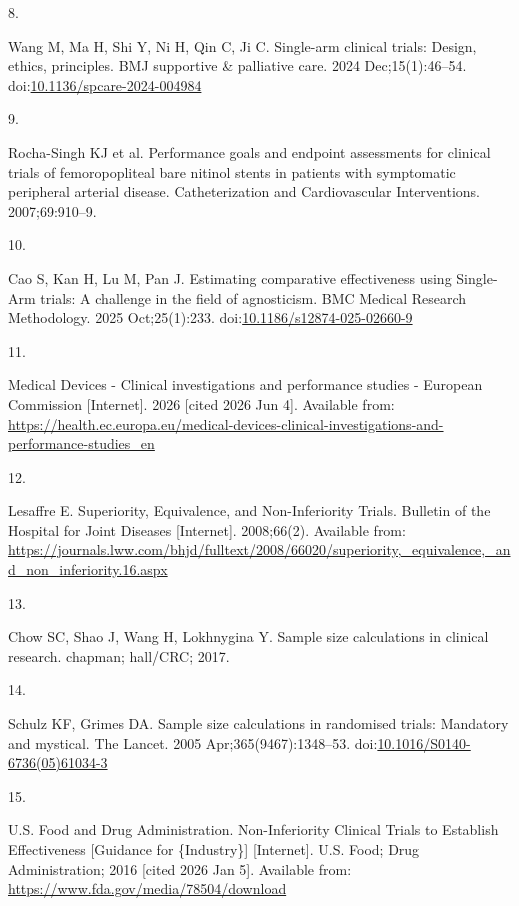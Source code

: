 \documentclass{article}
\newlength{\cslhangindent}
\newlength{\csllabelwidth}
\newenvironment{CSLReferences}[2] %
 {\begin{list}{}{%
  \setlength{\itemindent}{0pt}
  \setlength{\leftmargin}{0pt}
  \setlength{\parsep}{0pt}
  \ifodd #1
   \setlength{\leftmargin}{\cslhangindent}
   \setlength{\itemindent}{-1\cslhangindent}
  \fi
  \setlength{\itemsep}{#2\baselineskip}}}
 {\end{list}}
\newcommand{\CSLLeftMargin}[1]{\parbox[t]{\csllabelwidth}{#1}}
\newcommand{\CSLRightInline}[1]{\parbox[t]{\linewidth - \csllabelwidth}{#1}\break}
\begin{document}
\begin{CSLReferences}{0}{1}
\CSLLeftMargin{8. }%
\CSLRightInline{Wang M, Ma H, Shi Y, Ni H, Qin C, Ji C. Single-arm
clinical trials: Design, ethics, principles. BMJ supportive \&
palliative care. 2024 Dec;15(1):46--54.
doi:\href{https://doi.org/10.1136/spcare-2024-004984}{10.1136/spcare-2024-004984}}

\CSLLeftMargin{9. }%
\CSLRightInline{{Rocha-Singh KJ et al.} Performance goals and endpoint
assessments for clinical trials of femoropopliteal bare nitinol stents
in patients with symptomatic peripheral arterial disease.
Catheterization and Cardiovascular Interventions. 2007;69:910--9.}

\CSLLeftMargin{10. }%
\CSLRightInline{Cao S, Kan H, Lu M, Pan J. Estimating comparative
effectiveness using {Single}-{Arm} trials: {A} challenge in the field of
agnosticism. BMC Medical Research Methodology. 2025 Oct;25(1):233.
doi:\href{https://doi.org/10.1186/s12874-025-02660-9}{10.1186/s12874-025-02660-9}}

\CSLLeftMargin{11. }%
\CSLRightInline{Medical {Devices} - {Clinical} investigations and
performance studies - {European} {Commission} {[}Internet{]}. 2026
{[}cited 2026 Jun 4{]}. Available from:
\url{https://health.ec.europa.eu/medical-devices-clinical-investigations-and-performance-studies_en}}

\CSLLeftMargin{12. }%
\CSLRightInline{Lesaffre E. Superiority, {Equivalence}, and
{Non}-{Inferiority} {Trials}. Bulletin of the Hospital for Joint
Diseases {[}Internet{]}. 2008;66(2). Available from:
\url{https://journals.lww.com/bhjd/fulltext/2008/66020/superiority,_equivalence,_and_non_inferiority.16.aspx}}

\CSLLeftMargin{13. }%
\CSLRightInline{Chow SC, Shao J, Wang H, Lokhnygina Y. Sample size
calculations in clinical research. chapman; hall/CRC; 2017.}

\CSLLeftMargin{14. }%
\CSLRightInline{Schulz KF, Grimes DA. Sample size calculations in
randomised trials: Mandatory and mystical. The Lancet. 2005
Apr;365(9467):1348--53.
doi:\href{https://doi.org/10.1016/S0140-6736(05)61034-3}{10.1016/S0140-6736(05)61034-3}}

\CSLLeftMargin{15. }%
\CSLRightInline{U.S. Food and Drug Administration. Non-{Inferiority}
{Clinical} {Trials} to {Establish} {Effectiveness} {[}Guidance for
\{Industry\}{]} {[}Internet{]}. U.S. Food; Drug Administration; 2016
{[}cited 2026 Jan 5{]}. Available from:
\url{https://www.fda.gov/media/78504/download}}


\end{CSLReferences}
\end{document}

